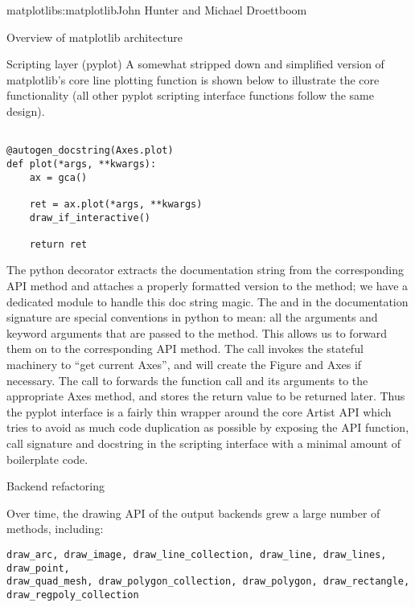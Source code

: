 \begin{aosachapter}{matplotlib}{s:matplotlib}{John Hunter and Michael Droettboom}
\begin{aosasect1}{Overview of matplotlib architecture}
\begin{aosasect2}{Scripting layer (pyplot)}
A somewhat stripped down and simplified version of matplotlib's core
line plotting function  is shown below to
illustrate the core functionality (all other pyplot scripting
interface functions follow the same design).

\begin{verbatim}

@autogen_docstring(Axes.plot)
def plot(*args, **kwargs):
    ax = gca()

    ret = ax.plot(*args, **kwargs)
    draw_if_interactive()

    return ret

\end{verbatim}

The python decorator  extracts
the documentation string from the corresponding API method and
attaches a properly formatted version to the 
method; we have a dedicated module  to
handle this doc string magic.  The  and  in
the documentation signature are special conventions in python to mean:
all the arguments and keyword arguments that are passed to the method.
This allows us to forward them on to the corresponding API method.
The call  invokes the stateful machinery to ``get
current Axes'', and will create the Figure and Axes if necessary.  The
call to  forwards the function
call and its arguments to the appropriate Axes method, and stores the
return value to be returned later.  Thus the pyplot interface is a
fairly thin wrapper around the core Artist API which tries to avoid as
much code duplication as possible by exposing the API function, call
signature and docstring in the scripting interface with a minimal
amount of boilerplate code.


\end{aosasect2}


\end{aosasect1}


\begin{aosasect1}{Backend refactoring}


Over time, the drawing API of the output backends grew a large number
of methods, including:

\begin{verbatim}
draw_arc, draw_image, draw_line_collection, draw_line, draw_lines, draw_point,
draw_quad_mesh, draw_polygon_collection, draw_polygon, draw_rectangle,
draw_regpoly_collection
\end{verbatim}


\end{aosasect1}
\end{aosachapter}
